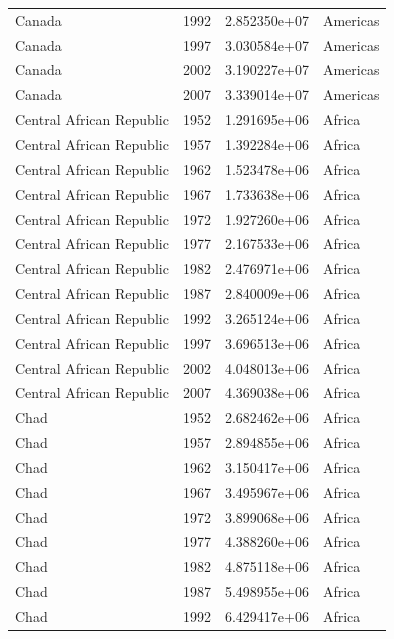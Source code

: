\documentclass[
  letterpaper,
  DIV=11,
  numbers=noendperiod]{scrreprt}
\begin{document}
\begin{tcolorbox}
\begin{tabular}{lrrl}
Canada                   &  1992 &  2.852350e+07 &  Americas \\
Canada                   &  1997 &  3.030584e+07 &  Americas \\
Canada                   &  2002 &  3.190227e+07 &  Americas \\
Canada                   &  2007 &  3.339014e+07 &  Americas \\
Central African Republic &  1952 &  1.291695e+06 &    Africa \\
Central African Republic &  1957 &  1.392284e+06 &    Africa \\
Central African Republic &  1962 &  1.523478e+06 &    Africa \\
Central African Republic &  1967 &  1.733638e+06 &    Africa \\
Central African Republic &  1972 &  1.927260e+06 &    Africa \\
Central African Republic &  1977 &  2.167533e+06 &    Africa \\
Central African Republic &  1982 &  2.476971e+06 &    Africa \\
Central African Republic &  1987 &  2.840009e+06 &    Africa \\
Central African Republic &  1992 &  3.265124e+06 &    Africa \\
Central African Republic &  1997 &  3.696513e+06 &    Africa \\
Central African Republic &  2002 &  4.048013e+06 &    Africa \\
Central African Republic &  2007 &  4.369038e+06 &    Africa \\
Chad                     &  1952 &  2.682462e+06 &    Africa \\
Chad                     &  1957 &  2.894855e+06 &    Africa \\
Chad                     &  1962 &  3.150417e+06 &    Africa \\
Chad                     &  1967 &  3.495967e+06 &    Africa \\
Chad                     &  1972 &  3.899068e+06 &    Africa \\
Chad                     &  1977 &  4.388260e+06 &    Africa \\
Chad                     &  1982 &  4.875118e+06 &    Africa \\
Chad                     &  1987 &  5.498955e+06 &    Africa \\
Chad                     &  1992 &  6.429417e+06 &    Africa \\

\end{tabular}
\end{tcolorbox}
\end{document}
